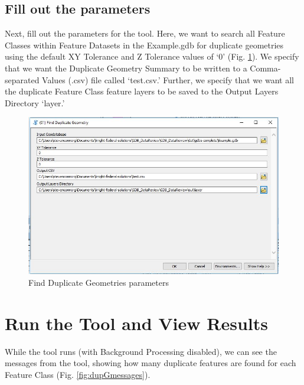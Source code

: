 \documentclass[openany]{book}
\theoremstyle{definition}
\theoremstyle{definition}
\theoremstyle{definition}
\theoremstyle{remark}
\begin{document}
\subsection{Fill out the parameters}\label{fill-out-the-parameters-2}

Next, fill out the parameters for the tool. Here, we want to search all
Feature Classes within Feature Datasets in the Example.gdb for duplicate
geometries using the default XY Tolerance and Z Tolerance values of `0'
(Fig. \ref{fig:dupGparams}). We specify that we want the Duplicate
Geometry Summary to be written to a Comma-separated Values (.csv) file
called `test.csv.' Further, we specify that we want all the duplicate
Feature Class feature layers to be saved to the Output Layers Directory
`layer.'

\begin{figure}[H]

{\centering \includegraphics{figures/dupG-params} 

}

\caption{Find Duplicate Geometries parameters}\label{fig:dupGparams}
\end{figure}

\section{Run the Tool and View
Results}\label{run-the-tool-and-view-results-2}

While the tool runs (with Background Processing disabled), we can see
the messages from the tool, showing how many duplicate features are
found for each Feature Class (Fig. \ref{fig:dupGmessages}).
\end{document}
